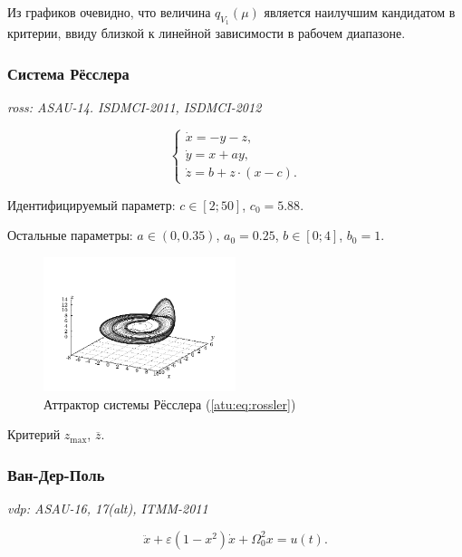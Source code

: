 \documentclass[a4paper,12pt]{article}
\newcommand{\LinkRef}[1]{ \textit{#1} }
\begin{document}
Из графиков очевидно, что величина $ q_{V_1}(\mu) $
является наилучшим кандидатом в критерии, ввиду близкой к линейной зависимости
в рабочем диапазоне.




\FloatBarrier
\subsubsection{Система Рёсслера} %

\LinkRef{
  ross: ASAU-14. ISDMCI-2011, ISDMCI-2012
}

\begin{equation}
\begin{cases}
  \dot{x}  = -y - z  ,  \\
  \dot{y}  = x + a y ,\\
  \dot{z}  = b + z \cdot ( x-c ) .
\end{cases}
\label{atu:eq:rossler}
\end{equation}

Идентифицируемый параметр:
$ c \in [2; 50] $, $c_0=5.88$.

Остальные параметры:
\( a \in (0, 0.35 ) \), $a_0=0.25$,
\(b \in[0;4] \), $b_0=1$.

\begin{figure}[htb!]
\centerline{\includegraphics[width=0.5\textwidth]{p/cha/ross_phase3.pdf} }
\caption{Аттрактор системы Рёсслера (\ref{atu:eq:rossler})}
\label{atu:f:ross_phase}
\end{figure}

Критерий
$ z_{\max}$, $ \overline{z} $.



\FloatBarrier
\subsubsection{Ван-Дер-Поль} %

\LinkRef{
  vdp: ASAU-16, 17(alt), ITMM-2011
}

\begin{equation}
 \ddot{x} + \varepsilon (1-x^2)  \dot{x} + \Omega_0^2 x  = u(t) .
\label{atu:eq:vdp}
\end{equation}
\end{document}

